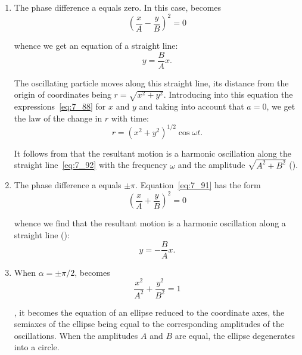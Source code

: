 \begin{enumerate}[1.]
	\item The phase difference a equals zero. In this case,  becomes
	\begin{equation*}
		\left(\frac{x}{A} - \frac{y}{B}\right)^{2} = 0
	\end{equation*}
	
	\noindent
	whence we get an equation of a straight line:
	\begin{equation}\label{eq:7_92}
		y = \frac{B}{A}x.
	\end{equation}
	
	\noindent
	The oscillating particle moves along this straight line, its distance from the origin of coordinates being $r=\sqrt{x^2+y^2}$. Introducing into this equation the expressions~\eqref{eq:7_88} for $x$ and $y$ and taking into account that $a=0$, we get the law of the change in $r$ with time:
	\begin{equation}\label{eq:7_93}
		r = \left(x^2 + y^2\right)^{1/2}\cos\omega t.
	\end{equation}
	
	\noindent
	It follows from  that the resultant motion is a harmonic oscillation along the straight line~\eqref{eq:7_92} with the frequency $\omega$ and the amplitude $\sqrt{A^2+B^2}$ ().
	
	\item The phase difference a equals $\pm\pi$. Equation~\eqref{eq:7_91} has the form
	\begin{equation*}
		\left(\frac{x}{A} + \frac{y}{B}\right)^{2} = 0
	\end{equation*}
	
	\noindent
	whence we find that the resultant motion is a harmonic oscillation along a straight line ():
	\begin{equation*}
		y = -\frac{B}{A}x.
	\end{equation*}
	
	\item When $\alpha=\pm\pi/2$,  becomes
	\begin{equation}\label{eq:7_94}
		\frac{x^2}{A^2} + \frac{y^2}{B^2} = 1
	\end{equation}

	\noindent
	\ie, it becomes the equation of an ellipse reduced to the coordinate axes, the semiaxes of the ellipse being equal to the corresponding amplitudes of the oscillations. When the amplitudes $A$ and $B$ are equal, the ellipse degenerates into a circle.
	

\end{enumerate}
